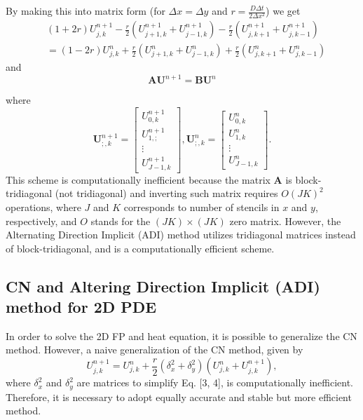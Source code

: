 \documentclass[12pt]{article}		%
\begin{document}
By making this into matrix form (for $\Delta x = \Delta y$ and $r = \frac{D \Delta t}{2 \Delta x^2}$) we get
\begin{align} \label{eq:cd2d}
	& (1+ 2r) U_{j,k}^{n+1} - \frac{r}{2} \left(U_{j+1,k}^{n+1} + U_{j-1,k}^{n+1} \right) - \frac{r}{2} \left(U_{j,k+1}^{n+1} + U_{j,k-1}^{n+1} \right) \\
	& = (1- 2r) U_{j,k}^{n} + \frac{r}{2} \left(U_{j+1,k}^{n} + U_{j-1,k}^{n} \right) + \frac{r}{2} \left(U_{j,k+1}^{n} + U_{j,k-1}^{n} \right) 
\end{align}
and
\[
	\textbf{A} \textbf{U}^{n+1} = \textbf{B} \textbf{U}^n
\]

where
\begin{equation*} %
	\textbf{U}_{;, k}^{n+1} = \begin{bmatrix} U_{0,k}^{n+1}\\ U_{1,;}^{n+1} \\ \vdots \\ U_{J-1,k}^{n+1} \end{bmatrix}, 
	\textbf{U}_{;,k}^n = \begin{bmatrix} U_{0,k}^n\\ U_{1,k}^n \\ \vdots \\ U_{J-1,k}^n \end{bmatrix}.
\end{equation*}
This scheme is computationally inefficient because the matrix $\textbf{A}$ is block-tridiagonal (not tridiagonal) and inverting such matrix requires $O(JK)^2$ operations, where $J$ and $K$ corresponds to number of stencils in $x$ and $y$, respectively, and $O$ stands for the $(JK) \times (JK)$ zero matrix. However, the Alternating Direction Implicit (ADI) method utilizes tridiagonal matrices instead of block-tridiagonal, and is a computationally efficient scheme.


\subsection*{CN and Altering Direction Implicit (ADI) method for 2D PDE}
In order to solve the 2D FP and heat equation, it is possible to generalize the CN method. However, a naive generalization of the CN method, given by 
\[
		U_{j,k}^{n+1} = U_{j,k}^{n} + \frac{r}{2} (\delta^2_x + \delta^2_y) \left(U_{j,k}^n + U_{j,k}^{n+1} \right),
\]
where $\delta^2_x$ and $\delta^2_y$ are matrices to simplify Eq. [3, 4], is computationally inefficient. Therefore, it is necessary to adopt equally accurate and stable but more efficient method.
\end{document}
